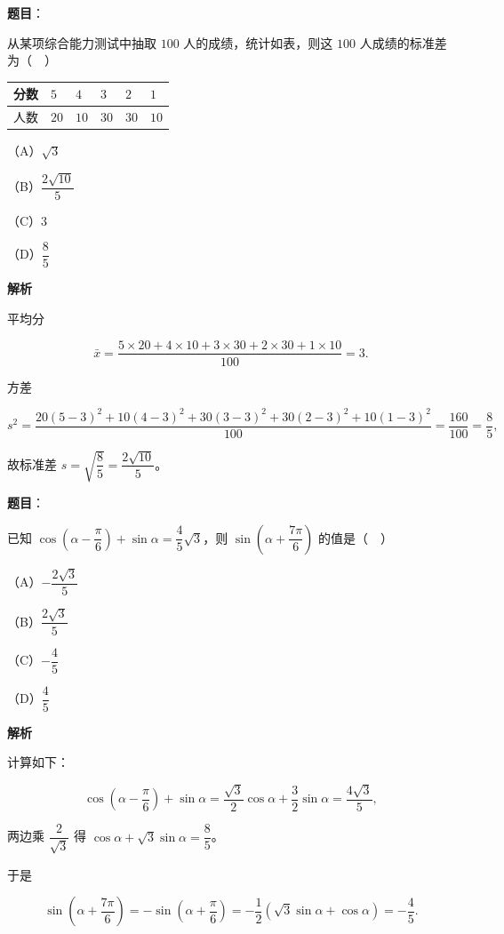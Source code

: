 \begin{answer}

\textbf{题目}：

从某项综合能力测试中抽取 $100$ 人的成绩，统计如表，则这 $100$ 人成绩的标准差为（　）

\begin{center}
\begin{tabular}{llllll}
\toprule
分数 & $5$ & $4$ & $3$ & $2$ & $1$ \\
\midrule
人数 & $20$ & $10$ & $30$ & $30$ & $10$ \\
\bottomrule
\end{tabular}
\end{center}

（A）$\sqrt3$

（B）$\dfrac{2\sqrt{10}}5$

（C）$3$

（D）$\dfrac85$

\textbf{解析}

平均分

\nopagebreak[4]
\[\bar x=\frac{5\times20+4\times10+3\times30+2\times30+1\times10}{100}=3.\]

方差

\nopagebreak[4]
\[s^2=\frac{20(5-3)^2+10(4-3)^2+30(3-3)^2+30(2-3)^2+10(1-3)^2}{100}=\frac{160}{100}=\frac85,\]

故标准差 $s=\sqrt{\dfrac85}=\dfrac{2\sqrt{10}}5$。


\end{answer}
\begin{answer}

\textbf{题目}：

已知 $\cos\left(\alpha-\dfrac{\pi}{6}\right)+\sin\alpha=\dfrac45\sqrt3$，则 $\sin\left(\alpha+\dfrac{7\pi}{6}\right)$ 的值是（　）

（A）$-\dfrac{2\sqrt3}5$

（B）$\dfrac{2\sqrt3}5$

（C）$-\dfrac45$

（D）$\dfrac45$

\textbf{解析}

计算如下：

\nopagebreak[4]
\[\cos\left(\alpha-\frac{\pi}6\right)+\sin\alpha=\frac{\sqrt3}2\cos\alpha+\frac32\sin\alpha=\frac{4\sqrt3}5,\]

两边乘 $\dfrac2{\sqrt3}$ 得 $\cos\alpha+\sqrt3\sin\alpha=\dfrac85$。

于是

\nopagebreak[4]
\[\sin\left(\alpha+\frac{7\pi}6\right)=-\sin\left(\alpha+\frac{\pi}6\right)=-\frac12\left(\sqrt3\sin\alpha+\cos\alpha\right)=-\frac45.\]


\end{answer}
